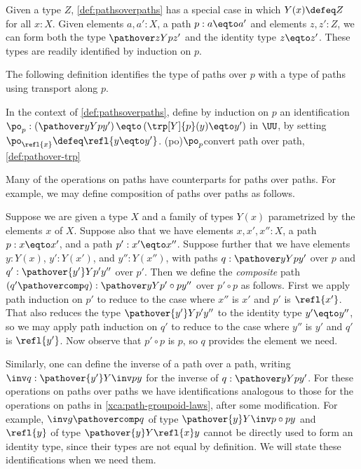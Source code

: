 \begin{remark} 
Given a type $Z$, \cref{def:pathsoverpaths} has a special case
in which $Y(x)\defeq Z$ for all $x:X$.
Given elements $a,a':X$, a path $p : a \eqto a'$ and elements $z,z':Z$, 
we can form both the type $\pathover z Y p {z'}$ and the identity 
type $z\eqto z'$. These types are readily identified by induction on $p$.
\end{remark}


The following definition identifies the type of paths over $p$ with a type
of paths using transport along $p$.

\begin{definition}\label{def:pathover-trp}
In the context of \cref{def:pathsoverpaths}, define by induction on $p$ an
identification
$\po_p: \left(\pathover y Y p {y'}\right) \eqto \left( \trp[Y]{p}(y) \eqto y'\right)$ in $\UU$,
by setting $\po_{\refl{x}} \defeq \refl{y \eqto y'}$.%
\glossary(po){$\protect\po_p$}{convert path over path, \cref{def:pathover-trp}}
\end{definition}

Many of the operations on paths have counterparts for paths over paths.
For example, we may define composition of paths over paths as follows.

\begin{definition}\label{def:pathovercomposition}
  Suppose we are given a type $X$ and a family of types $Y(x)$ parametrized by the elements $x$ of $X$.
  Suppose also that we have elements $x, x', x'' : X$, a path $p : x \eqto x'$, and a path $p' : x' \eqto x''$.
  Suppose further that we have elements $y : Y(x)$, $y' : Y(x')$, and $y'' : Y(x'')$, with paths $q : \pathover y Y p {y'}$ over $p$
  and $q' : \pathover {y'} Y {p'} {y''}$ over $p'$.
  Then we define the \emph{composite} path $(q' \pathovercomp q) : \pathover y Y {p' \circ p} {y''}$ over $p' \circ p$ as follows.
  First we apply path induction on $p'$ to reduce to the case where $x''$ is $x'$ and $p'$ is $\refl{x'}$.
  That also reduces the type $\pathover {y'} Y {p'} {y''}$ to the identity type $y' \eqto y''$, so we may apply path induction on $q'$ to reduce
  to the case where $y''$ is $y'$ and $q'$ is $\refl{y'}$.
  Now observe that $p' \circ p$ is $p$, so $q$ provides the element we need.
\end{definition}

Similarly, one can define the inverse of a path over a path,
writing $\inv q : \pathover {y'} Y {\inv p} y$ for the inverse
of $q : \pathover y Y p {y'}$.
For these operations on paths over paths we have identifications
analogous to those for the operations on paths in
\cref{xca:path-groupoid-laws}, after some modification.
For example,
${\inv g} \pathovercomp q$ of type $\pathover {y} Y {{\inv p}\circ p} y$ and
$\refl{y}$ of type $\pathover {y} Y {\refl{x}} y$ cannot be directly used
to form an identity type, since their types are not equal by definition.
We will state these identifications when we need them.

